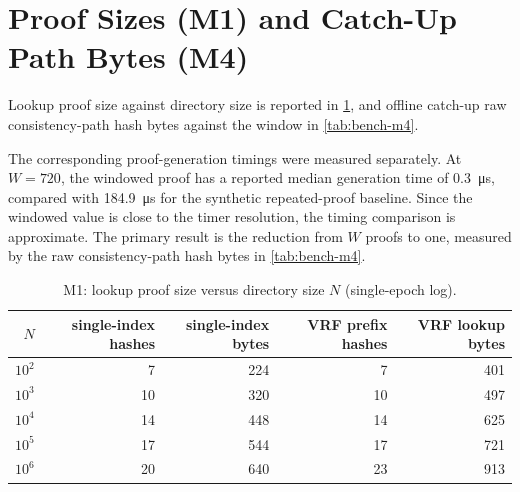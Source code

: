 \section{Proof Sizes (M1) and Catch-Up Path Bytes (M4)}\label{sec:bench-sizes}

Lookup proof size against directory size is reported in \cref{tab:bench-m1}, and offline
catch-up raw consistency-path hash bytes against the window in \cref{tab:bench-m4}.

The corresponding proof-generation timings were measured separately. At $W=720$, the windowed
proof has a reported median generation time of \SI{0.3}{\micro\second}, compared with
\SI{184.9}{\micro\second} for the synthetic repeated-proof baseline. Since the windowed value is
close to the timer resolution, the timing comparison is approximate. The primary result is the
reduction from $W$ proofs to one, measured by the raw consistency-path hash bytes in
\cref{tab:bench-m4}.

\begin{table}[ht]
\centering
\caption{M1: lookup proof size versus directory size $N$ (single-epoch log).}
\label{tab:bench-m1}
\small
\begin{tabular}{@{}rrrrr@{}}
\toprule
$N$ & single-index hashes & single-index bytes & VRF prefix hashes & VRF lookup bytes \\
\midrule
$10^2$ & 7  & 224 & 7  & 401 \\
$10^3$ & 10 & 320 & 10 & 497 \\
$10^4$ & 14 & 448 & 14 & 625 \\
$10^5$ & 17 & 544 & 17 & 721 \\
$10^6$ & 20 & 640 & 23 & 913 \\
\bottomrule
\end{tabular}

\end{table}

